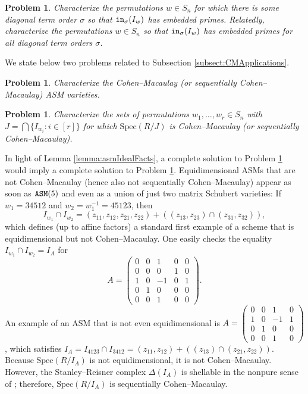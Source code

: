 \documentclass[12pt,reqno]{amsart}
\newtheorem{problem}[theorem]{Problem}
\newtheorem{Main Conjecture}[theorem]{Main Conjecture}
\theoremstyle{remark}
\theoremstyle{plain}
\newcommand{\init}{{\tt in}}
\newcommand{\asm}{{\tt ASM}}
\newcommand{\spec}{{\mbox{Spec}}}
\begin{document}
\begin{problem}
Characterize the permutations $w \in S_n$ for which there is some diagonal term order $\sigma$ so that $\init_\sigma(I_w)$ has embedded primes. Relatedly, characterize the permutations $w \in S_n$ so that $\init_\sigma(I_w)$ has embedded primes for all diagonal term orders $\sigma$.  
\end{problem}

We state below two problems related to Subsection \ref{subsect:CMApplications}.
\begin{problem}\label{prob:ASMCM}
Characterize the Cohen--Macaulay (or sequentially Cohen--Macaulay) ASM varieties.
\end{problem}

\begin{problem}\label{prob:SchubUnionCM}
Characterize the sets of permutations $w_1, \ldots, w_r \in S_n$ with 
$J= \bigcap\{ I_{w_i}:i \in [r]\}$
for which $\spec(R/J)$ is Cohen--Macaulay (or sequentially Cohen--Macaulay).
\end{problem}

In light of Lemma \ref{lemma:asmIdealFacts}, a complete solution to Problem \ref{prob:SchubUnionCM} would imply a complete solution to Problem \ref{prob:ASMCM}.  Equidimensional ASMs that are not Cohen--Macaulay (hence also not sequentially Cohen--Macaulay) appear as soon as $\asm(5)$ and even as a union of just two matrix Schubert varieties: If $w_1 = 34512$ and $w_2 = w_1^{-1} = 45123$, then \[
I_{w_1} \cap I_{w_2} = (z_{11},z_{12},z_{21}, z_{22})+((z_{13},z_{23}) \cap (z_{31},z_{32})),
\] which defines (up to affine factors) a standard first example of a scheme that is equidimensional but not Cohen--Macaulay.  One easily checks the equality $I_{w_1} \cap I_{w_2} = I_A$ for \[
A = \begin{pmatrix}
0 & 0 & 1 & 0 & 0\\
0 & 0 & 0 & 1 & 0\\
1 & 0 & -1 & 0 & 1\\
0 & 1 & 0 & 0 & 0\\
0 & 0 & 1 & 0 & 0
\end{pmatrix}.
\]
An example of an ASM that is not even equidimensional is $A = \begin{pmatrix} 0 & 0 & 1 & 0\\
1 & 0 & -1 & 1 \\
0 & 1 & 0 & 0 \\
0 & 0 & 1 & 0 \end{pmatrix}$, which satisfies $I_A = I_{4123} \cap I_{3412} = (z_{11}, z_{12}) + ((z_{13}) \cap (z_{21}, z_{22})).$  Because $\spec(R/I_A)$ is not equidimensional, it is not Cohen--Macaulay.  However, the Stanley--Reisner complex $\Delta(I_A)$ is shellable in the nonpure sense of \cite[Definition 2.1]{BW96}; therefore, $\spec(R/I_A)$ is sequentially Cohen--Macaulay.  
\end{document}
